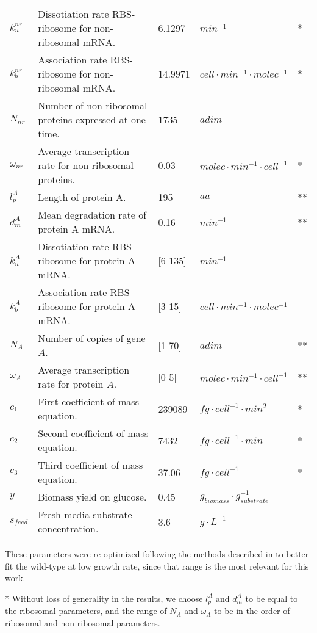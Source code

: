 \begin{specialtable}[H]
\begin{tabular}{lllll}
	$k_u^{nr}$ & Dissotiation rate RBS-ribosome for non-ribosomal mRNA. & 6.1297 & $min^{-1}$ & \cite{nobel2020resources}* \\
	$k_b^{nr}$ & Association rate RBS-ribosome for non-ribosomal mRNA. & 14.9971 & $cell \cdot min^{-1} \cdot molec^{-1}$ & \cite{nobel2020resources}* \\
	$N_{nr}$ & Number of non ribosomal proteins expressed at one time. & 1735 & $adim$ & \cite{nobel2020resources} \\
	$\omega_{nr}$ & Average transcription rate for non ribosomal proteins. & 0.03 & $molec \cdot min^{-1} \cdot cell^{-1}$ & \cite{nobel2020resources}* \\
	$l_p^A$ & Length of protein A. & 195 & $aa$ & ** \\
	$d_m^A$ & Mean degradation rate of protein A mRNA. & 0.16 & $min^{-1}$ & ** \\
	$k_u^A$ & Dissotiation rate RBS-ribosome for protein A mRNA. & [6 135] & $min^{-1}$ & \cite{deSmit2003,Kierzek2001} \\
	$k_b^A$ & Association rate RBS-ribosome for protein A mRNA. & [3 15] & $cell \cdot min^{-1} \cdot molec^{-1}$ & \cite{deSmit2003,Kierzek2001,SALIS201119} \\
	$N_A$ & Number of copies of gene $A$. & [1 70] & $adim$ & ** \\
	$\omega_A$ & Average transcription rate for protein $A$. & [0 5] & $molec \cdot min^{-1} \cdot cell^{-1}$ & ** \\
	$c_1$ & First coefficient of mass equation. & 239089 & $fg \cdot cell^{-1} \cdot min^2$ & \cite{nobel2020resources}* \\
	$c_2$ & Second coefficient of mass equation. & 7432 & $fg \cdot cell^{-1} \cdot min$ & \cite{nobel2020resources}* \\
	$c_3$ & Third coefficient of mass equation. & 37.06 & $fg \cdot cell^{-1}$ & \cite{nobel2020resources}* \\
	$y$ & Biomass yield on glucose. & 0.45 & $g^{ }_{biomass} \cdot g^{-1}_{substrate}$ & \cite{Link2008} \\
	$s_{feed}$ & Fresh media substrate concentration. & 3.6 & $g \cdot L^{-1}$ & \cite{Zhuang2013} \\
\bottomrule
\end{tabular}
{\raggedright * These parameters were re-optimized following the methods described in \cite{nobel2020resources} to better fit the wild-type at low growth rate, since that range is the most relevant for this work. \par}
{\raggedright ** Without loss of generality in the results, we choose $l_p^A$ and $d_m^A$ to be equal to the ribosomal parameters, and the range of $N_A$ and $\omega_A$ to be in the order of ribosomal and non-ribosomal parameters. \par}
\end{specialtable}
